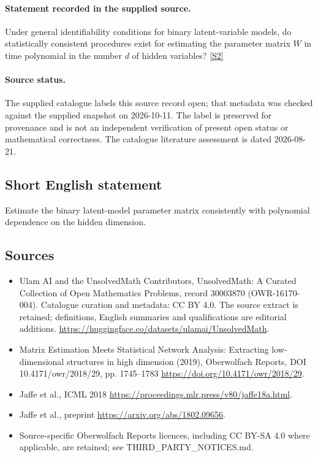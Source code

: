 \documentclass[11pt]{article}
\begin{document}
\paragraph{Statement recorded in the supplied source.}
Under general identifiability conditions for binary latent-variable models, do statistically consistent procedures exist for estimating the parameter matrix $W$ in time polynomial in the number $d$ of hidden variables? \href{https://doi.org/10.4171/owr/2018/29}{[S2]}
\paragraph{Source status.}
The supplied catalogue labels this source record open; that metadata was checked against the supplied snapshot on 2026-10-11. The label is preserved for provenance and is not an independent verification of present open status or mathematical correctness. The catalogue literature assessment is dated 2026-08-21.
\subsection{Short English statement}
Estimate the binary latent-model parameter matrix consistently with polynomial dependence on the hidden dimension.
\subsection{Sources}
\begin{itemize}
\item[S1] Ulam AI and the UnsolvedMath Contributors, UnsolvedMath: A Curated Collection of Open Mathematics Problems, record 30003870 (OWR-16170-004). Catalogue curation and metadata: CC BY 4.0. The source extract is retained; definitions, English summaries and qualifications are editorial additions.
\url{https://huggingface.co/datasets/ulamai/UnsolvedMath}.
\item[S2] Matrix Estimation Meets Statistical Network Analysis: Extracting low-dimensional structures in high dimension (2019), Oberwolfach Reports, DOI 10.4171/owr/2018/29, pp. 1745--1783
\url{https://doi.org/10.4171/owr/2018/29}.
\item[S3] Jaffe et al., ICML 2018
\url{https://proceedings.mlr.press/v80/jaffe18a.html}.
\item[S4] Jaffe et al., preprint
\url{https://arxiv.org/abs/1802.09656}.
\item Source-specific Oberwolfach Reports licences, including CC BY-SA 4.0 where applicable, are retained; see THIRD\_PARTY\_NOTICES.md.
\end{itemize}
\end{document}
